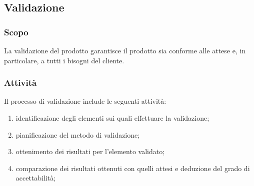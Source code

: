 \subsection{Validazione}
\subsubsection{Scopo}
La validazione del prodotto garantisce il prodotto sia conforme alle attese e, in particolare, a tutti i bisogni del cliente.

\subsubsection{Attività}
Il processo di validazione include le seguenti attività:
\begin{enumerate}
	\item identificazione degli elementi sui quali effettuare la validazione;
	\item pianificazione del metodo di validazione;
	\item ottenimento dei risultati per l'elemento validato;
	\item comparazione dei risultati ottenuti con quelli attesi e deduzione del grado di accettabilità;
\end{enumerate}